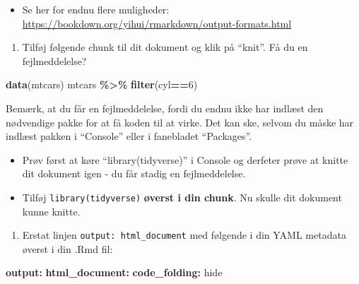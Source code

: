\documentclass[
]{book}
\newenvironment{Shaded}{\begin{snugshade}}{\end{snugshade}}
\newcommand{\AttributeTok}[1]{\textcolor[rgb]{0.13,0.29,0.53}{#1}}
\newcommand{\DecValTok}[1]{\textcolor[rgb]{0.00,0.00,0.81}{#1}}
\newcommand{\FunctionTok}[1]{\textcolor[rgb]{0.13,0.29,0.53}{\textbf{#1}}}
\newcommand{\KeywordTok}[1]{\textcolor[rgb]{0.13,0.29,0.53}{\textbf{#1}}}
\newcommand{\NormalTok}[1]{#1}
\newcommand{\SpecialCharTok}[1]{\textcolor[rgb]{0.81,0.36,0.00}{\textbf{#1}}}
\providecommand{\tightlist}{%
  \setlength{\itemsep}{0pt}\setlength{\parskip}{0pt}}
\begin{document}
\begin{itemize}
\tightlist
\item
  Se her for endnu flere muligheder: \url{https://bookdown.org/yihui/rmarkdown/output-formats.html}
\end{itemize}

\begin{enumerate}
\def\labelenumi{\arabic{enumi})}
\setcounter{enumi}{7}
\tightlist
\item
  Tilføj følgende chunk til dit dokument og klik på ``knit''. Få du en fejlmeddelelse?
\end{enumerate}

\begin{Shaded}
\begin{Highlighting}[]
\FunctionTok{data}\NormalTok{(mtcars)}
\NormalTok{mtcars }\SpecialCharTok{\%\textgreater{}\%} \FunctionTok{filter}\NormalTok{(cyl}\SpecialCharTok{==}\DecValTok{6}\NormalTok{)}
\end{Highlighting}
\end{Shaded}

Bemærk, at du får en fejlmeddelelse, fordi du endnu ikke har indlæst den nødvendige pakke for at få koden til at virke. Det kan ske, selvom du måske har indlæst pakken i ``Console'' eller i fanebladet ``Packages''.

\begin{itemize}
\tightlist
\item
  Prøv først at køre ``library(tidyverse)'' i Console og derfeter prøve at knitte dit dokument igen - du får stadig en fejlmeddelelse.
\item
  Tilføj \texttt{library(tidyverse)} \textbf{øverst i din chunk}. Nu skulle dit dokument kunne knitte.
\end{itemize}

\begin{enumerate}
\def\labelenumi{\arabic{enumi})}
\setcounter{enumi}{8}
\tightlist
\item
  Erstat linjen \texttt{output:\ html\_document} med følgende i din YAML metadata øverst i din .Rmd fil:
\end{enumerate}

\begin{Shaded}
\begin{Highlighting}[]
\FunctionTok{output}\KeywordTok{:}
\AttributeTok{  }\FunctionTok{html\_document}\KeywordTok{:}
\AttributeTok{    }\FunctionTok{code\_folding}\KeywordTok{:}\AttributeTok{ hide}
\end{Highlighting}
\end{Shaded}
\end{document}
